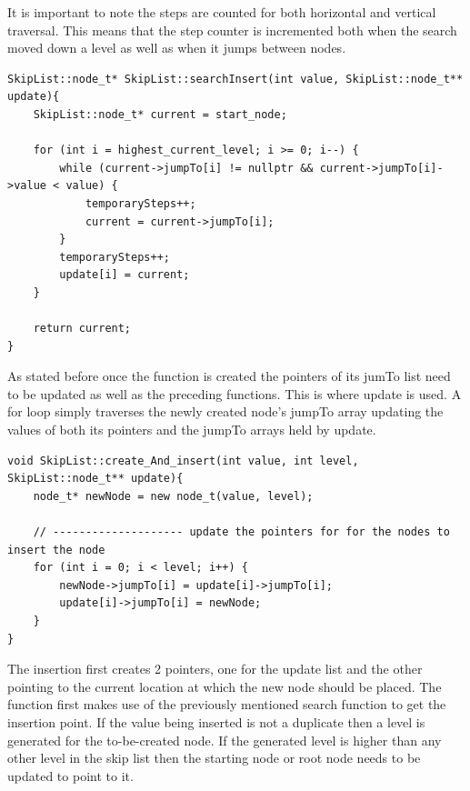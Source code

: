 \documentclass[12pt, a4paper]{report}
\begin{document}
It is important to note the steps are counted for both horizontal and vertical traversal. This means that the step counter is incremented both when the search moved down a level as well as when it jumps between nodes.
\begin{verbatim}
SkipList::node_t* SkipList::searchInsert(int value, SkipList::node_t** update){
    SkipList::node_t* current = start_node;
    
    for (int i = highest_current_level; i >= 0; i--) {
        while (current->jumpTo[i] != nullptr && current->jumpTo[i]->value < value) {
            temporarySteps++;
            current = current->jumpTo[i];
        }
        temporarySteps++;
        update[i] = current;
    }
    
    return current;
}
\end{verbatim}
As stated before once the function is created the pointers of its jumTo list need to be updated as well as the preceding functions. This is where update is used. A for loop simply traverses the newly created node's jumpTo array updating the values of both its pointers and the jumpTo arrays held by update.
\begin{verbatim}
void SkipList::create_And_insert(int value, int level, SkipList::node_t** update){
    node_t* newNode = new node_t(value, level);

    // -------------------- update the pointers for for the nodes to insert the node
    for (int i = 0; i < level; i++) {
        newNode->jumpTo[i] = update[i]->jumpTo[i];
        update[i]->jumpTo[i] = newNode;
    }
}
\end{verbatim}
The insertion first creates 2 pointers, one for the update list and the other pointing to the current location at which the new node should be placed. The function first makes use of the previously mentioned search function to get the insertion point. If the value being inserted is not a duplicate then a level is generated for the to-be-created node. If the generated level is higher than any other level in the skip list then the starting node or root node needs to be updated to point to it. 
\end{document}
